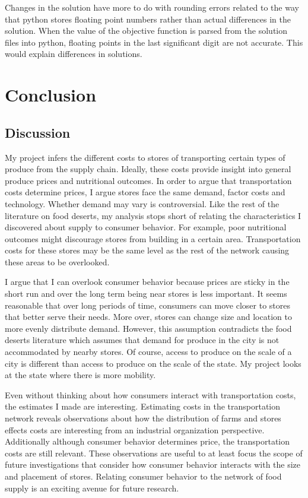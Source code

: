 \documentclass{report}
\begin{document}
Changes in the solution have more to do with rounding errors related to the way that python stores floating point numbers rather than actual differences in the solution. When the value of the objective function is parsed from the solution files into python, floating points in the last significant digit are not accurate. This would explain differences in solutions.

\chapter{Conclusion}

\section{Discussion}

My project infers the different costs to stores of transporting certain types of produce from the supply chain. Ideally, these costs provide insight into general produce prices and nutritional outcomes. In order to argue that transportation costs determine prices, I argue stores face the same demand, factor costs and technology. Whether demand may vary is controversial. Like the rest of the literature on food deserts, my analysis stops short of relating the characteristics I discovered about supply to consumer behavior. For example, poor nutritional outcomes might discourage stores from building in a certain area. Transportation costs for these stores may be the same level as the rest of the network causing these areas to be overlooked.

I argue that I can overlook consumer behavior because prices are sticky in the short run and over the long term being near stores is less important. It seems reasonable that over long periods of time, consumers can move closer to stores that better serve their needs. More over, stores can change size and location to more evenly distribute demand. However, this assumption contradicts the food deserts literature which assumes that demand for produce in the city is not accommodated by nearby stores. Of course, access to produce on the scale of a city is different than access to produce on the scale of the state. My project looks at the state where there is more mobility.

Even without thinking about how consumers interact with transportation costs, the estimates I made are interesting. Estimating costs in the transportation network reveals observations about how the distribution of farms and stores effects costs are interesting from an industrial organization perspective. Additionally although consumer behavior determines price, the transportation costs are still relevant. These observations are useful to at least focus the scope of future investigations that consider how consumer behavior interacts with the size and placement of stores.  Relating consumer behavior to the network of food supply is an exciting avenue for future research.
\end{document}
